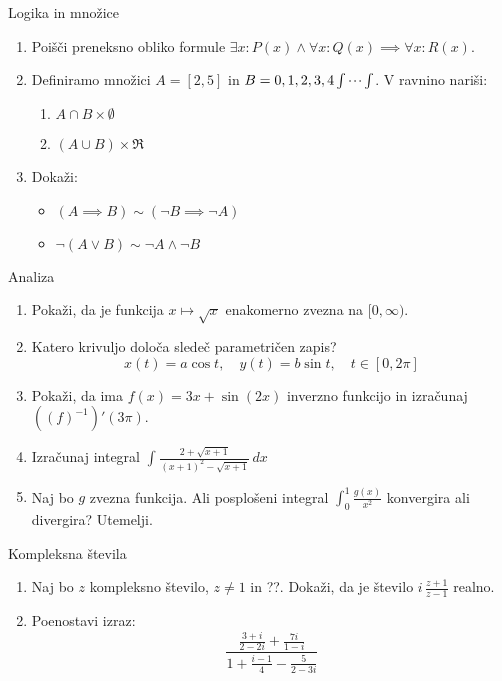 \begin{frame}{Logika in množice}
	\begin{enumerate}
		\item
		Poišči preneksno obliko formule \(\exists x : P(x) \land \forall x : Q(x) \implies \forall x : R(x)\).
		\item 
		Definiramo množici \(A = [2, 5]\) in \(B = {0, 1, 2, 3, 4 \idotsint}\).
		V ravnino nariši:
		\begin{enumerate}
			\item \(A \cap B \times \emptyset\)
			\item \((A \cup B) \times \Re\)
		\end{enumerate}
		\item
		Dokaži:
		\begin{itemize}
			\item \((A \implies B) \sim (\neg B \implies \neg A) \)
			\item \(\neg (A \lor B) \sim \neg A \land \neg B \)
		\end{itemize}
	\end{enumerate}
\end{frame}

\begin{frame}{Analiza}
	\begin{enumerate}
		\item
		Pokaži, da je funkcija \(x \mapsto \sqrt{x}\) enakomerno zvezna na \([0, \infty)\).
		\item 
		Katero krivuljo določa sledeč parametričen zapis?
		$$
		   x(t) = a \cos t, \quad %
		   y(t) = b \sin t, \quad %
		   t \in [0, 2 \pi]
		$$ 
		\item
		Pokaži, da ima \(f(x) = 3x + \sin(2x)\) inverzno funkcijo in izračunaj \({((f)^{-1})'} (3\pi)\).
		
		\item
		Izračunaj integral 
		\( \displaystyle
		\int_{}^{}\frac{2+\sqrt{x+1}}{(x+1)^2-\sqrt{x+1}} \, dx
		\)
		 \item 
		Naj bo $g$ zvezna funkcija. Ali posplošeni integral 
		\(\int_{0}^{1} \frac{g(x)}{x^{2}}\)
		konvergira ali divergira? Utemelji.
	\end{enumerate}
\end{frame}

\begin{frame}{Kompleksna števila}
	\begin{enumerate}
		\item
		Naj bo $z$ kompleksno število, $z \ne 1$ in ??.
		Dokaži, da je število \( i \, \frac{z+1}{z-1} \) realno.
		\item
		Poenostavi izraz:
		\[\frac{\displaystyle \frac{3 + i}{2 - 2i} + \frac{7i}{1-i}}{\displaystyle 1 + \frac{i - 1}{4} - \frac{5}{2 - 3i}}\]
	\end{enumerate}
\end{frame}